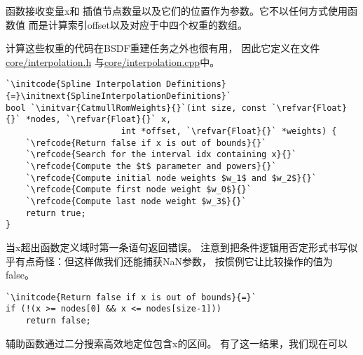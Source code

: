 函数接收变量{\ttfamily x}和
插值节点数量以及它们的位置作为参数。它不以任何方式使用函数值
而是计算索引{\ttfamily offset}以及对应于中四个权重的数组。

计算这些权重的代码在BSDF重建任务之外也很有用，
因此它定义在文件\href{https://github.com/mmp/pbrt-v3/blob/master/src/core/interpolation.h}{\ttfamily core/interpolation.h}
与\href{https://github.com/mmp/pbrt-v3/blob/master/src/core/interpolation.cpp}{\ttfamily core/interpolation.cpp}中。
\begin{lstlisting}
`\initcode{Spline Interpolation Definitions}{=}\initnext{SplineInterpolationDefinitions}`
bool `\initvar{CatmullRomWeights}{}`(int size, const `\refvar{Float}{}` *nodes, `\refvar{Float}{}` x,
                       int *offset, `\refvar{Float}{}` *weights) {
    `\refcode{Return false if x is out of bounds}{}`
    `\refcode{Search for the interval idx containing x}{}`
    `\refcode{Compute the $t$ parameter and powers}{}`
    `\refcode{Compute initial node weights $w_1$ and $w_2$}{}`
    `\refcode{Compute first node weight $w_0$}{}`
    `\refcode{Compute last node weight $w_3$}{}`
    return true;
}
\end{lstlisting}
当{\ttfamily x}超出函数定义域时第一条语句返回错误。
注意到把条件逻辑用否定形式书写似乎有点奇怪：但这样做我们还能捕获NaN参数，
按惯例它让比较操作的值为{\ttfamily false}。
\begin{lstlisting}
`\initcode{Return false if x is out of bounds}{=}`
if (!(x >= nodes[0] && x <= nodes[size-1]))
    return false;
\end{lstlisting}

辅助函数通过二分搜索高效地定位包含{\ttfamily x}的区间。
有了这一结果，我们现在可以